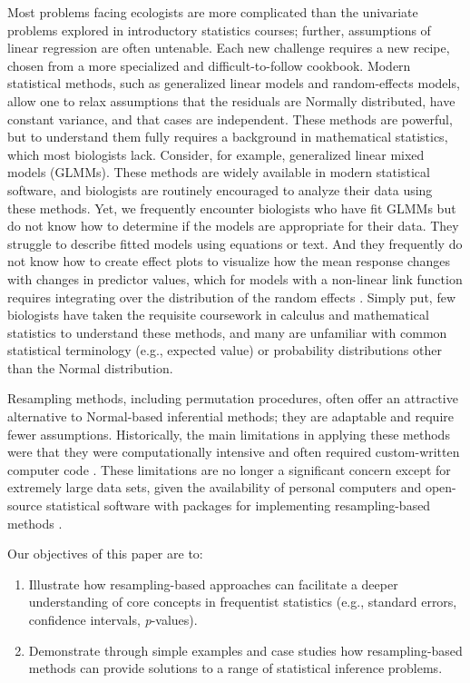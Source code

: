 \documentclass[fleqn,10pt]{wlpeerj} %
\begin{document}
Most problems facing ecologists are more complicated than the univariate problems explored in introductory statistics courses; further, assumptions of linear regression are often untenable. Each new challenge requires a new recipe, chosen from a more specialized and difficult-to-follow cookbook. Modern statistical methods, such as generalized linear models and random-effects models, allow one to relax assumptions that the residuals are Normally distributed, have constant variance, and that cases are independent. These methods are powerful, but to understand them fully requires a background in mathematical statistics, which most biologists lack. Consider, for example, generalized linear mixed models (GLMMs). These methods are widely available in modern statistical software, and biologists are routinely encouraged to analyze their data using these methods. Yet, we frequently encounter biologists who have fit GLMMs but do not know how to determine if the models are appropriate for their data. They struggle to describe fitted models using equations or text. And they frequently do not know how to create effect plots to visualize how the mean response changes with changes in predictor values, which for models with a non-linear link function requires integrating over the distribution of the random effects \citep{Fieberg2009}. Simply put, few biologists have taken the requisite coursework in calculus and mathematical statistics to understand these methods, and many are unfamiliar with common statistical terminology (e.g., expected value) or probability distributions other than the Normal distribution.

Resampling methods, including permutation procedures, often offer an attractive alternative to Normal-based inferential methods; they are adaptable and require fewer assumptions. Historically, the main limitations in applying these methods were that they were computationally intensive and often required custom-written computer code \citep{Cobb2007}. These limitations are no longer a significant concern except for extremely large data sets, given the availability of personal computers and open-source statistical software with packages for implementing resampling-based methods \citep[e.g.,][]{davison_hinkley_1997, pruim2017mosaic, Canty2019, permute, vegan, Rcore}.

Our objectives of this paper are to:

\begin{enumerate}
\def\labelenumi{\arabic{enumi}.}
\item
  Illustrate how resampling-based approaches can facilitate a deeper understanding of core concepts in frequentist statistics (e.g., standard errors, confidence intervals, \emph{p}-values).
\item
  Demonstrate through simple examples and case studies how resampling-based methods can provide solutions to a range of statistical inference problems.
\end{enumerate}
\end{document}
